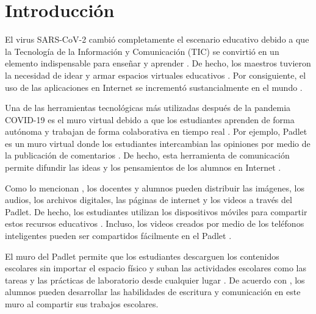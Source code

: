 \documentclass[spanish]{textolivre}
\begin{document}
\begin{polyabstract}
\begin{english}
\begin{abstract}
\end{abstract}
\end{english}
\end{polyabstract}

\section{Introducción}
El virus SARS-CoV-2 cambió completamente el escenario educativo debido a que la Tecnología de la Información y Comunicación (TIC) se convirtió en un elemento indispensable para enseñar y aprender \cite{gomeztrigueros2023,landa2023,yersel2023}. De hecho, los maestros tuvieron la necesidad de idear y armar espacios virtuales educativos \cite{ali2023,chugh2023,tonbuloglu2023}. Por consiguiente, el uso de las aplicaciones en Internet se incrementó sustancialmente en el mundo \cite{kaynak2023,tuamsuk2023,zhang2023}. 

Una de las herramientas tecnológicas más utilizadas después de la pandemia COVID-19 es el muro virtual debido a que los estudiantes aprenden de forma autónoma y trabajan de forma colaborativa en tiempo real \cite{lee2023,lomos2023,turner2023}. Por ejemplo, Padlet es un muro virtual donde los estudiantes intercambian las opiniones por medio de la publicación de comentarios \cite{lee2023,nkomo2021,siantuba2023}. De hecho, esta herramienta de comunicación permite difundir las ideas y los pensamientos de los alumnos en Internet \cite{almwzaiji2022,bergaoui2023,lomos2023}.

Como lo mencionan \textcite{bergaoui2023}, los docentes y alumnos pueden distribuir las imágenes, los audios, los archivos digitales, las páginas de internet y los videos a través del Padlet. De hecho, los estudiantes utilizan los dispositivos móviles para compartir estos recursos educativos \cite{abdullah2022,siantuba2023}. Incluso, los videos creados por medio de los teléfonos inteligentes pueden ser compartidos fácilmente en el Padlet \cite{abdullah2022}.

El muro del Padlet permite que los estudiantes descarguen los contenidos escolares sin importar el espacio físico y suban las actividades escolares como las tareas y las prácticas de laboratorio desde cualquier lugar \cite{almwzaiji2022,bergaoui2023,kong2021,zhu2021}. De acuerdo con \textcite{lee2023}, los alumnos pueden desarrollar las habilidades de escritura y comunicación en este muro al compartir sus trabajos escolares.
\end{document}
